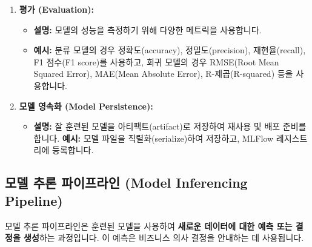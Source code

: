 \documentclass[11pt,a4paper]{article}
\theoremstyle{definition}
\begin{document}
\begin{enumerate}
    \item \textbf{평가 (Evaluation):}
    \begin{itemize}
        \item \textbf{설명:} 모델의 성능을 측정하기 위해 다양한 메트릭을 사용합니다.
        \item \textbf{예시:} 분류 모델의 경우 정확도(accuracy), 정밀도(precision), 재현율(recall), F1 점수(F1 score)를 사용하고, 회귀 모델의 경우 RMSE(Root Mean Squared Error), MAE(Mean Absolute Error), R-제곱(R-squared) 등을 사용합니다.
    \end{itemize}

    \item \textbf{모델 영속화 (Model Persistence):}
    \begin{itemize}
        \item \textbf{설명:} 잘 훈련된 모델을 아티팩트(artifact)로 저장하여 재사용 및 배포 준비를 합니다.
        \textbf{예시:} 모델 파일을 직렬화(serialize)하여 저장하고, MLFlow 레지스트리에 등록합니다.
    \end{itemize}
\end{enumerate}

\subsection{모델 추론 파이프라인 (Model Inferencing Pipeline)}

\begin{summarybox}
모델 추론 파이프라인은 훈련된 모델을 사용하여 \textbf{새로운 데이터에 대한 예측 또는 결정을 생성}하는 과정입니다. 이 예측은 비즈니스 의사 결정을 안내하는 데 사용됩니다.
\end{summarybox}
\end{document}
